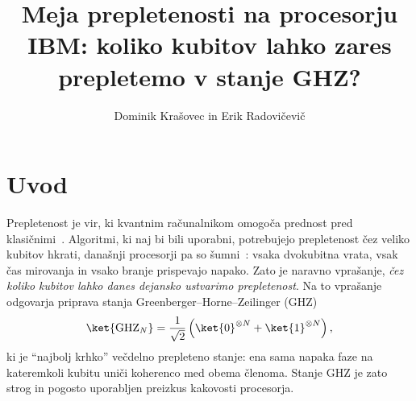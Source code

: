 %
%

\graphicspath{{Skupina20/img/}}

\title{Meja prepletenosti na procesorju IBM: koliko kubitov lahko zares prepletemo v stanje GHZ?}
\author{Dominik Krašovec in Erik Radovičevič}
\maketitle





\section{Uvod}
\label{g20:sec:uvod}

Prepletenost je vir, ki kvantnim računalnikom omogoča prednost pred klasičnimi~\cite{nielsen2010}. Algoritmi, ki naj bi bili
uporabni, potrebujejo prepletenost čez veliko kubitov hkrati, današnji procesorji pa so šumni~\cite{preskill2018}: vsaka
dvokubitna vrata, vsak čas mirovanja in vsako branje prispevajo napako. Zato je naravno vprašanje, \emph{čez koliko kubitov
lahko danes dejansko ustvarimo prepletenost}. Na to vprašanje odgovarja priprava stanja Greenberger--Horne--Zeilinger
(GHZ)~\cite{g20:greenberger1990}
\begin{equation}
\ket{\mathrm{GHZ}_N} = \frac{1}{\sqrt{2}}\left(\ket{0}^{\otimes N} + \ket{1}^{\otimes N}\right),
\label{g20:eq:ghz}
\end{equation}
ki je \enquote{najbolj krhko} večdelno prepleteno stanje: ena sama napaka faze na kateremkoli kubitu uniči koherenco med
obema členoma. Stanje GHZ je zato strog in pogosto uporabljen preizkus kakovosti procesorja.

